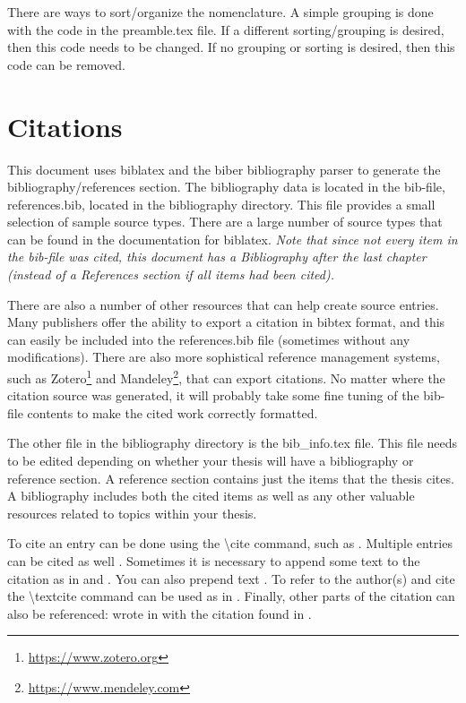 There are ways to sort/organize the nomenclature.
A simple grouping is done with the code in the preamble.tex file.
If a different sorting/grouping is desired, then this code needs to be changed.
If no grouping or sorting is desired, then this code can be removed.

\section{Citations} \label{sec:Citations}
This document uses biblatex and the biber bibliography parser to generate the bibliography/references section.
The bibliography data is located in the bib-file, references.bib, located in the bibliography directory.
This file provides a small selection of sample source types.
There are a large number of source types that can be found in the documentation for biblatex.
\emph{Note that since not every item in the bib-file was cited, this document has a Bibliography after the last chapter (instead of a References section if all items had been cited).}

There are also a number of other resources that can help create source entries.
Many publishers offer the ability to export a citation in bibtex format, and this can easily be included into the references.bib file (sometimes without any modifications).
There are also more sophistical reference management systems, such as Zotero\footnote{ \url{https://www.zotero.org}} and Mandeley\footnote{\url{https://www.mendeley.com}}, that can export citations.
No matter where the citation source was generated, it will probably take some fine tuning of the bib-file contents to make the cited work correctly formatted.

The other file in the bibliography directory is the bib\_info.tex file.
This file needs to be edited depending on whether your thesis will have a bibliography or reference section.
A reference section contains just the items that the thesis cites.
A bibliography includes both the cited items as well as any other valuable resources related to topics within your thesis.

To cite an entry can be done using the \textbackslash cite command, such as \cite{cpthesis_github}.
Multiple entries can be cited as well \cite{drela1986a,dryden1943a,einstein1905,lopez2007a}.
Sometimes it is necessary to append some text to the citation as in \cite[135]{dryden1943a} and \cite[section 2]{head1958a}.
You can also prepend text \cite[such as][120]{Koutsovasilis2008}.
To refer to the author(s) and cite the \textbackslash textcite command can be used as in \textcite{dirac1981}.
Finally, other parts of the citation can also be referenced: \citeauthor{einstein1905} wrote  in \citeyear{einstein1905} with the citation found in \cite{einstein1905}.

